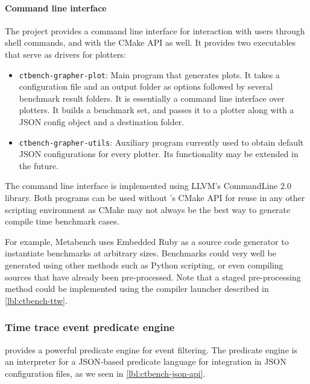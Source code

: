 \documentclass[../main]{subfiles}
\begin{document}
\paragraph{Command line interface}

The \grapher project provides a command line interface for interaction with
users through shell commands, and with the CMake API as well. It provides two
executables that serve as drivers for \grapher plotters:

\begin{itemize}

\item \lstinline{ctbench-grapher-plot}: Main program that generates plots.
      It takes a configuration file and an output folder as options followed by
      several benchmark result folders.
      It is essentially a command line interface over plotters.
      It builds a benchmark set, and passes it to a plotter along with a JSON
      config object and a destination folder.

\item \lstinline{ctbench-grapher-utils}: Auxiliary program currently used to
      obtain default JSON configurations for every plotter. Its functionality
      may be extended in the future.

\end{itemize}

The command line interface is implemented using LLVM's CommandLine 2.0 library.
Both programs can be used without \ctbench's CMake API for reuse in any other
scripting environment as CMake may not always be the best way to generate \cpp
compile time benchmark cases.

For example, Metabench\cite{metabench} uses Embedded Ruby as a source code
generator to instantiate benchmarks at arbitrary sizes. Benchmarks could very
well be generated using other methods such as Python scripting, or even
compiling \cpp sources that have already been pre-processed. Note that a staged
pre-processing method could be implemented using the compiler launcher described
in \ref{lbl:ctbench-ttw}.

\subsubsection{Time trace event predicate engine}
\label{lbl:grapher-predicate-engine}

\grapher provides a powerful predicate engine for event filtering.
The predicate engine is an interpreter for a JSON-based predicate language for
integration in JSON configuration files, as we seen in
\ref{lbl:ctbench-json-api}.
\end{document}
